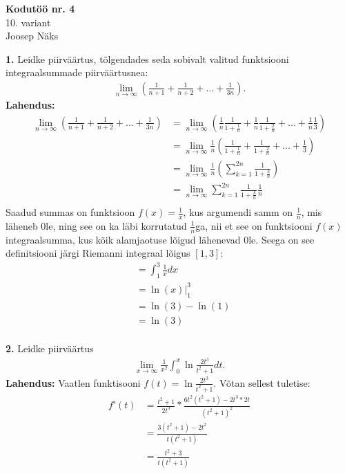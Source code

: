 \documentclass{article}
\begin{document}
\begin{center}
\Large\textbf{Kodut\"o\"o nr. 4}\\
10. variant\\
\small{Joosep N\"aks}
\end{center}
\textbf{1.} Leidke piirv\"a\"artus, t\~olgendades seda sobivalt valitud funktsiooni integraalsummade piirv\"a\"artusnea:
\begin{gather*}
\lim_{n\to\infty}\left(\frac{1}{n+1}+\frac{1}{n+2}+...+\frac{1}{3n}\right).
\end{gather*}
\textbf{Lahendus:}
\begin{equation*}
\begin{aligned}
\lim_{n\to\infty}\left(\frac{1}{n+1}+\frac{1}{n+2}+...+\frac{1}{3n}\right)&=\lim_{n\to\infty}\left(\frac{1}{n}\frac{1}{1+\frac{1}{n}}+\frac{1}{n}\frac{1}{1+\frac{2}{n}}+...+\frac{1}{n}\frac{1}{3}\right)\\
&=\lim_{n\to\infty}\frac{1}{n}\left(\frac{1}{1+\frac{1}{n}}+\frac{1}{1+\frac{2}{n}}+...+\frac{1}{3}\right)\\
&=\lim_{n\to\infty}\frac{1}{n}\left(\sum_{k=1}^{2n}\frac{1}{1+\frac{k}{n}}\right)\\
&=\lim_{n\to\infty}\sum_{k=1}^{2n}\frac{1}{1+\frac{k}{n}}\frac{1}{n}\\
\end{aligned}
\end{equation*}
Saadud summas on funktsioon $f(x)=\frac{1}{x}$, kus argumendi samm on $\frac{1}{n}$, mis l\"aheneb 0le, ning see on ka l\"abi korrutatud $\frac{1}{n}$ga, nii et see on funktsiooni $f(x)$ integraalsumma, kus k\~oik alamjaotuse l\~oigud l\"ahenevad 0le. Seega on see definitsiooni j\"argi Riemanni integraal l\~oigus $[1,3]$:
\begin{equation*}
\begin{aligned}
&=\int_1^3\frac{1}{x}dx\\
&=\ln(x)|_1^3\\
&=\ln(3)-\ln(1)\\
&=\ln(3)
\end{aligned}
\end{equation*}
\pagebreak\\
\textbf{2.} Leidke piirv\"a\"artus
\begin{gather*}
\lim_{x\to\infty}\frac{1}{x^2}\int_0^x\ln\frac{2t^3}{t^2+1}dt.
\end{gather*}
\textbf{Lahendus:} Vaatlen funktisooni $f(t)=\ln\frac{2t^3}{t^2+1}$. V\~otan sellest tuletise:
\begin{equation*}
\begin{aligned}
f'(t)&=\frac{t^2+1}{2t^3}*\frac{6t^2(t^2+1)-2t^3*2t}{(t^2+1)^2}\\
&=\frac{3(t^2+1)-2t^2}{t(t^2+1)}\\
&=\frac{t^2+3}{t(t^2+1)}
\end{aligned}
\end{equation*}
\end{document}
